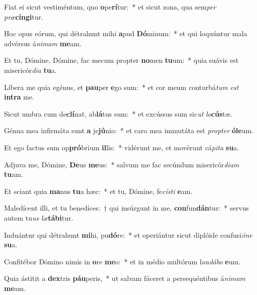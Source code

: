 \item Fiat ei sicut vestiméntum, quo \textbf{o}pe\textbf{rí}tur:~* et sicut zona, qua sem\textit{per} \textit{præ}\textbf{cín}\textbf{gi}tur.
\item Hoc opus eórum, qui détrahunt mihi \textbf{a}pud \textbf{Dó}minum:~* et qui loquúntur mala advérsus á\textit{ni}\textit{mam} \textbf{me}am.
\item Et tu, Dómine, Dómine, fac mecum propter \textbf{no}men \textbf{tu}um:~* quia suávis est misericór\textit{di}\textit{a} \textbf{tu}a.
\item Líbera me quia egénus, et \textbf{pau}per \textbf{e}go sum:~* et cor meum conturbá\textit{tum} \textit{est} \textbf{in}\textbf{tra} me.
\item Sicut umbra cum de\textbf{clí}nat, ab\textbf{lá}tus sum:~* et excússus sum sic\textit{ut} \textit{lo}\textbf{cús}tæ.
\item Génua mea infirmáta sunt \textbf{a} je\textbf{jú}nio:~* et caro mea immutáta est \textit{prop}\textit{ter} \textbf{ó}\textbf{le}um.
\item Et ego factus sum op\textbf{pró}brium \textbf{il}lis:~* vidérunt me, et movérunt cá\textit{pi}\textit{ta} \textbf{su}a.
\item Adjuva me, Dómine, \textbf{De}us \textbf{me}us:~* salvum me fac secúndum misericór\textit{di}\textit{am} \textbf{tu}am.
\item Et sciant quia \textbf{ma}nus \textbf{tu}a hæc:~* et tu, Dómine, fe\textit{cís}\textit{ti} \textbf{e}am.
\item Maledícent illi, et tu benedíces:~† qui insúrgunt in me, \textbf{con}fun\textbf{dán}tur:~* servus autem tu\textit{us} \textit{læ}\textbf{tá}\textbf{bi}tur.
\item Induántur qui détrahunt \textbf{mi}hi, pu\textbf{dó}re:~* et operiántur sicut diplóide confusi\textit{ó}\textit{ne} \textbf{su}a.
\item Confitébor Dómino nimis in \textbf{o}re \textbf{me}o:~* et in médio multórum lau\textit{dá}\textit{bo} \textbf{e}um.
\item Quia ástitit a \textbf{dex}tris \textbf{páu}peris,~* ut salvam fáceret a persequéntibus á\textit{ni}\textit{mam} \textbf{me}am.
